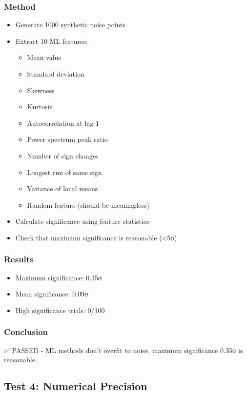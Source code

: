 \subsubsection{Method}
\begin{itemize}
    \item Generate 1000 synthetic noise points
    \item Extract 10 ML features:
    \begin{itemize}
        \item Mean value
        \item Standard deviation
        \item Skewness
        \item Kurtosis
        \item Autocorrelation at lag 1
        \item Power spectrum peak ratio
        \item Number of sign changes
        \item Longest run of same sign
        \item Variance of local means
        \item Random feature (should be meaningless)
    \end{itemize}
    \item Calculate significance using feature statistics
    \item Check that maximum significance is reasonable (<5σ)
\end{itemize}

\subsubsection{Results}
\begin{itemize}
    \item Maximum significance: 0.35σ
    \item Mean significance: 0.09σ
    \item High significance trials: 0/100
\end{itemize}

\subsubsection{Conclusion}
✅ PASSED - ML methods don't overfit to noise, maximum significance 0.35σ is reasonable.

\subsection{Test 4: Numerical Precision}

